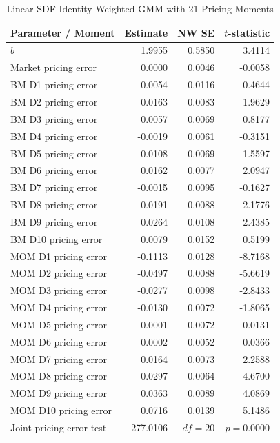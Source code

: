\begin{table}[H]
  \centering
  \caption{Linear-SDF Identity-Weighted GMM with 21 Pricing Moments}
  \label{tab:4b-gmm}
  \begin{minipage}{0.98\textwidth}
    \centering
    \scriptsize
    \begin{tabular*}{\linewidth}{@{\extracolsep{\fill}}lrrr@{}}
      \toprule
      Parameter / Moment & Estimate & NW SE & $t$-statistic \\
      \midrule
      $\hat{b}$ & 1.9955 & 0.5850 & 3.4114 \\
      Market pricing error & 0.0000 & 0.0046 & -0.0058 \\
      BM D1 pricing error & -0.0054 & 0.0116 & -0.4644 \\
      BM D2 pricing error & 0.0163 & 0.0083 & 1.9629 \\
      BM D3 pricing error & 0.0057 & 0.0069 & 0.8177 \\
      BM D4 pricing error & -0.0019 & 0.0061 & -0.3151 \\
      BM D5 pricing error & 0.0108 & 0.0069 & 1.5597 \\
      BM D6 pricing error & 0.0162 & 0.0077 & 2.0947 \\
      BM D7 pricing error & -0.0015 & 0.0095 & -0.1627 \\
      BM D8 pricing error & 0.0191 & 0.0088 & 2.1776 \\
      BM D9 pricing error & 0.0264 & 0.0108 & 2.4385 \\
      BM D10 pricing error & 0.0079 & 0.0152 & 0.5199 \\
      MOM D1 pricing error & -0.1113 & 0.0128 & -8.7168 \\
      MOM D2 pricing error & -0.0497 & 0.0088 & -5.6619 \\
      MOM D3 pricing error & -0.0277 & 0.0098 & -2.8433 \\
      MOM D4 pricing error & -0.0130 & 0.0072 & -1.8065 \\
      MOM D5 pricing error & 0.0001 & 0.0072 & 0.0131 \\
      MOM D6 pricing error & 0.0002 & 0.0052 & 0.0366 \\
      MOM D7 pricing error & 0.0164 & 0.0073 & 2.2588 \\
      MOM D8 pricing error & 0.0297 & 0.0064 & 4.6700 \\
      MOM D9 pricing error & 0.0363 & 0.0089 & 4.0869 \\
      MOM D10 pricing error & 0.0716 & 0.0139 & 5.1486 \\
      \midrule
      Joint pricing-error test & 277.0106 & $df=20$ & $p=0.0000$ \\
      \bottomrule
    \end{tabular*}


\end{minipage}
\end{table}

